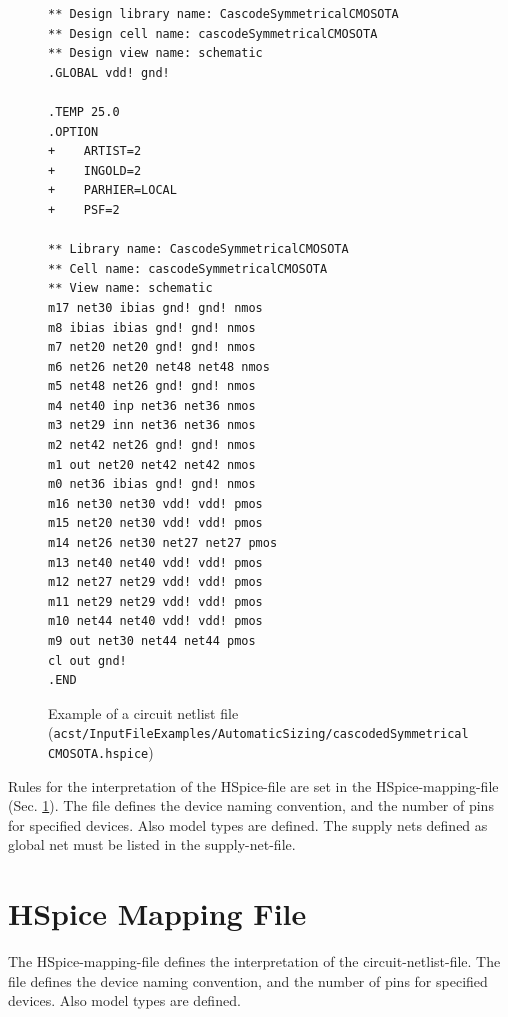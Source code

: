 \begin{figure}[h]
\begin{lstlisting}[basicstyle=\ttfamily\scriptsize,backgroundcolor={\color{gray!30}}, escapechar=? ]
** Design library name: CascodeSymmetricalCMOSOTA
** Design cell name: cascodeSymmetricalCMOSOTA
** Design view name: schematic
.GLOBAL vdd! gnd!

.TEMP 25.0
.OPTION
+    ARTIST=2
+    INGOLD=2
+    PARHIER=LOCAL
+    PSF=2

** Library name: CascodeSymmetricalCMOSOTA
** Cell name: cascodeSymmetricalCMOSOTA
** View name: schematic
m17 net30 ibias gnd! gnd! nmos
m8 ibias ibias gnd! gnd! nmos
m7 net20 net20 gnd! gnd! nmos
m6 net26 net20 net48 net48 nmos
m5 net48 net26 gnd! gnd! nmos
m4 net40 inp net36 net36 nmos
m3 net29 inn net36 net36 nmos
m2 net42 net26 gnd! gnd! nmos
m1 out net20 net42 net42 nmos
m0 net36 ibias gnd! gnd! nmos
m16 net30 net30 vdd! vdd! pmos
m15 net20 net30 vdd! vdd! pmos
m14 net26 net30 net27 net27 pmos
m13 net40 net40 vdd! vdd! pmos
m12 net27 net29 vdd! vdd! pmos
m11 net29 net29 vdd! vdd! pmos
m10 net44 net40 vdd! vdd! pmos
m9 out net30 net44 net44 pmos
cl out gnd!
.END
\end{lstlisting}
\caption{Example of a circuit netlist file ({\tt acst/InputFileExamples/AutomaticSizing/\protect \linebreak cascodedSymmetricalCMOSOTA.hspice})}
\end{figure}

Rules for the interpretation of the HSpice-file are  set in the HSpice-mapping-file (Sec. \ref{sec:InputFileHSpiceMapping}). The file defines the device naming convention, and the number of pins for specified devices. Also model types are defined. The supply nets defined as global net must be listed in the supply-net-file.

\section{HSpice Mapping File}\label{sec:InputFileHSpiceMapping}
The HSpice-mapping-file defines the interpretation of the circuit-netlist-file. The file defines the device naming convention, and the number of pins for specified devices. Also model types are defined.

